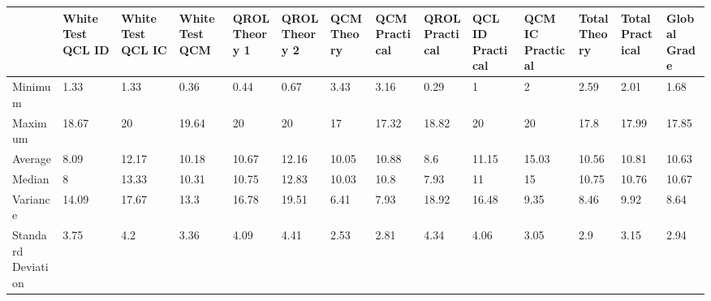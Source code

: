 \documentclass[a4paper,11pt]{report}
\numberwithin{figure}{chapter} %
\begin{document}
    \begin{center}
      \begin{tabular}{| p{1cm} | p{0.6cm} | p{0.6cm} | p{0.6cm} | p{0.6cm} | p{0.6cm} | p{0.6cm} | p{0.6cm} | p{0.6cm} | p{0.6cm} | p{0.6cm} | p{0.6cm} | p{0.6cm} | p{0.6cm} | }
      \hline
      & \tiny{White Test QCL ID} & \tiny{White Test QCL IC} & \tiny{White Test QCM} & \tiny{QROL Theory 1} & \tiny{QROL Theory 2} & \tiny{QCM Theory} & \tiny{QCM Practical} & \tiny{QROL Practical} & \tiny{QCL ID Practical} & \tiny{QCM IC Practical} & \tiny{Total Theory} & \tiny{Total Practical} & \tiny{Global Grade}\\ \hline
      \tiny{Minimum} & \tiny{1.33} & \tiny{1.33} & \tiny{0.36} & \tiny{0.44} & \tiny{0.67} & \tiny{3.43} & \tiny{3.16} & \tiny{0.29} & \tiny{1} & \tiny{2} & \tiny{2.59} & \tiny{2.01} & \tiny{1.68}\\ \hline
      \tiny{Maximum} & \tiny{18.67} & \tiny{20} & \tiny{19.64} & \tiny{20} & \tiny{20} & \tiny{17} & \tiny{17.32} & \tiny{18.82} & \tiny{20} & \tiny{20} & \tiny{17.8} & \tiny{17.99} & \tiny{17.85}\\ \hline
      \tiny{Average} & \tiny{8.09} & \tiny{12.17} & \tiny{10.18} & \tiny{10.67} & \tiny{12.16} & \tiny{10.05} & \tiny{10.88} & \tiny{8.6} & \tiny{11.15} & \tiny{15.03} & \tiny{10.56} & \tiny{10.81} & \tiny{10.63}\\ \hline
      \tiny{Median} & \tiny{8} & \tiny{13.33} & \tiny{10.31} & \tiny{10.75} & \tiny{12.83} & \tiny{10.03} & \tiny{10.8} & \tiny{7.93} & \tiny{11} & \tiny{15} & \tiny{10.75} & \tiny{10.76} & \tiny{10.67}\\ \hline
      \tiny{Variance} & \tiny{14.09} & \tiny{17.67} & \tiny{13.3} & \tiny{16.78} & \tiny{19.51} & \tiny{6.41} & \tiny{7.93} & \tiny{18.92} & \tiny{16.48} & \tiny{9.35} & \tiny{8.46} & \tiny{9.92} & \tiny{8.64}\\ \hline
      \tiny{Standard Deviation} & \tiny{3.75} & \tiny{4.2} & \tiny{3.36} & \tiny{4.09} & \tiny{4.41} & \tiny{2.53} & \tiny{2.81} & \tiny{4.34} & \tiny{4.06} & \tiny{3.05} & \tiny{2.9} & \tiny{3.15} & \tiny{2.94}\\ \hline
      \end{tabular}


    \end{center}
\end{document}
